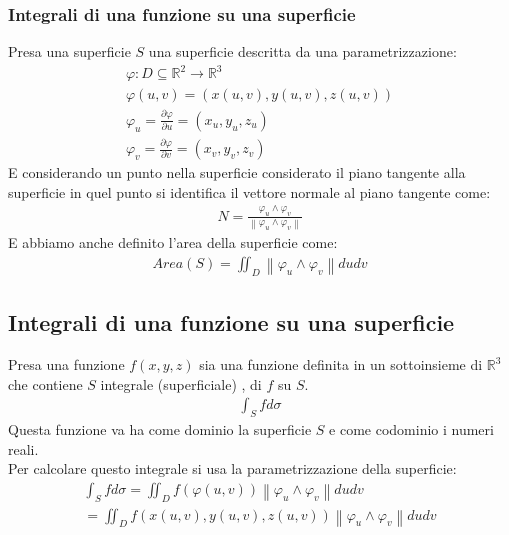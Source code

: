 \documentclass[a4paper, oneside]{article}
\begin{document}
\subsubsection{Integrali di una funzione su una superficie}
Presa una superficie $S$ una superficie descritta da una parametrizzazione:
\begin{gather*}
  \varphi : D \subseteq \mathbb{R}^2 \to \mathbb{R}^3\\
  \varphi(u,v) = (x(u,v), y(u,v), z(u,v))\\
  \varphi_u = \frac{\partial \varphi}{\partial u} = (x_u, y_u, z_u)\\
  \varphi_v = \frac{\partial \varphi}{\partial v} = (x_v, y_v, z_v)
\end{gather*}
E considerando un punto nella superficie considerato il piano tangente alla superficie in quel punto si identifica il vettore normale al piano tangente come:
\begin{gather*}
  N = \frac{\varphi_u \land \varphi_v}{\left\lVert \varphi_u \land \varphi_v \right\rVert}
\end{gather*}
E abbiamo anche definito l'area della superficie come:
\begin{gather*}
  Area(S) = \iint_D \left\lVert \varphi_u \land \varphi_v \right\rVert dudv
\end{gather*}
\subsection{Integrali di una funzione su una superficie}
Presa una funzione $f(x,y,z)$ sia una funzione definita in un sottoinsieme di $\mathbb{R}^3$ che contiene $S$ integrale (superficiale) , di $f$ su $S$.
\begin{gather*}
  \int_S f d \sigma
\end{gather*}
Questa funzione va ha come dominio la superficie $S$ e come codominio i numeri reali.\\
Per calcolare questo integrale si usa la parametrizzazione della superficie:
\begin{gather*}
  \int_S f d \sigma = \iint_D f(\varphi(u,v)) \left\lVert \varphi_u \land \varphi_v \right\rVert dudv\\
  = \iint_D f(x(u,v), y(u,v), z(u,v)) \left\lVert \varphi_u \land \varphi_v \right\rVert dudv
\end{gather*}
\end{document}
